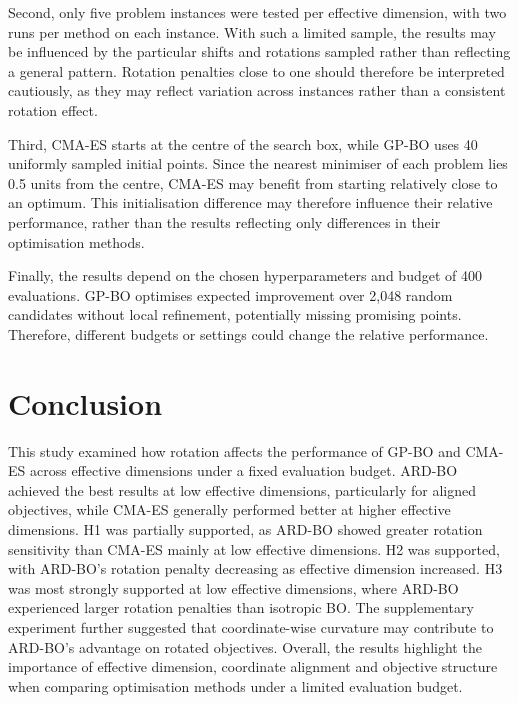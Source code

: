 \documentclass[11pt]{article}
\begin{document}
Second, only five problem instances were tested per effective dimension, with two runs per method on each instance. With such a limited sample, the results may be influenced by the particular shifts and rotations sampled rather than reflecting a general pattern. Rotation penalties close to one should therefore be interpreted cautiously, as they may reflect variation across instances rather than a consistent rotation effect.

Third, CMA-ES starts at the centre of the search box, while GP-BO uses 40 uniformly sampled initial points. Since the nearest minimiser of each problem lies 0.5 units from the centre, CMA-ES may benefit from starting relatively close to an optimum. This initialisation difference may therefore influence their relative performance, rather than the results reflecting only differences in their optimisation methods.

Finally, the results depend on the chosen hyperparameters and budget of 400 evaluations. GP-BO optimises expected improvement over 2,048 random candidates without local refinement, potentially missing promising points. Therefore, different budgets or settings could change the relative performance.

\section{Conclusion}

This study examined how rotation affects the performance of GP-BO and CMA-ES across effective dimensions under a fixed evaluation budget. ARD-BO achieved the best results at low effective dimensions, particularly for aligned objectives, while CMA-ES generally performed better at higher effective dimensions. H1 was partially supported, as ARD-BO showed greater rotation sensitivity than CMA-ES mainly at low effective dimensions. H2 was supported, with ARD-BO's rotation penalty decreasing as effective dimension increased. H3 was most strongly supported at low effective dimensions, where ARD-BO experienced larger rotation penalties than isotropic BO. The supplementary experiment further suggested that coordinate-wise curvature may contribute to ARD-BO's advantage on rotated objectives. Overall, the results highlight the importance of effective dimension, coordinate alignment and objective structure when comparing optimisation methods under a limited evaluation budget.

%
%
\end{document}
